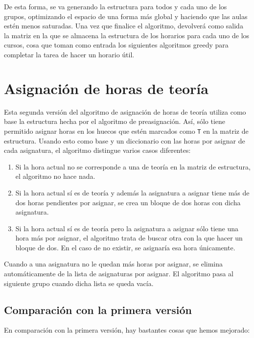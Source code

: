 De esta forma, se va generando la estructura para todos y cada uno de los grupos, optimizando el espacio de una forma más global y haciendo que las aulas estén menos saturadas. Una vez que finalice el algoritmo, devolverá como salida la matriz en la que se almacena la estructura de los horarios para cada uno de los cursos, cosa que toman como entrada los siguientes algoritmos greedy para completar la tarea de hacer un horario útil.

\section{Asignación de horas de teoría}
Esta segunda versión del algoritmo de asignación de horas de teoría utiliza como base la estructura hecha por el algoritmo de preasignación. Así, sólo tiene permitido asignar horas en los huecos que estén marcados como \texttt{T} en la matriz de estructura. Usando esto como base y un diccionario con las horas por asignar de cada asignatura, el algoritmo distingue varios casos diferentes:

\begin{enumerate}[---]
  \item Si la hora actual no se corresponde a una de teoría en la matriz de estructura, el algoritmo no hace nada.
  \item Si la hora actual sí es de teoría y además la asignatura a asignar tiene más de dos horas pendientes por asignar, se crea un bloque de dos horas con dicha asignatura.
  \item Si la hora actual sí es de teoría pero la asignatura a asignar sólo tiene una hora más por asignar, el algoritmo trata de buscar otra con la que hacer un bloque de dos. En el caso de no existir, se asignaría esa hora únicamente.
\end{enumerate}

Cuando a una asignatura no le quedan más horas por asignar, se elimina automáticamente de la lista de asignaturas por asignar. El algoritmo pasa al siguiente grupo cuando dicha lista se queda vacía.

\subsection{Comparación con la primera versión}
En comparación con la primera versión, hay bastantes cosas que hemos mejorado:

